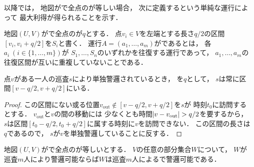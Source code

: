 以降では，
地図が{\graphLine}で全点の{\maxIdletime}が等しい場合，
次に定義するという単純な運行によって
最大利得が得られることを示す．

\begin{defi}
  \label{defi:independentSectionOperation}
  地図$(U, V)$が{\graphLine}で全点の{\maxIdletime}が$q$とする．
  点$v_i \in V$を左端とする長さ$q/2$の区間$[v_i, v_i + q/2]$を$S_i$と書く．
  運行$A = (a_1, \ldots, a_m)$がであるとは，
  各$a_i\ (i \in \{ 1, \ldots, m \})$が
  $S_1, \ldots, S_n$のいずれかを往復する運行であって，
  $a_1, \ldots, a_m$の往復区間が互いに重複していないことである．
\end{defi}


\begin{lemm}
  \label{lemm:RangeOfPatrollerOnLine}
  点$v$がある一人の巡査$s$により単独警邏されているとき，
  {\maxIdletime}を$q$として，
  $s$は常に区間$[v - q/2, v + q/2]$にいる．
\end{lemm}
\begin{proof}
  \newcommand{\vout}{v_{\mathrm{out}}}
  この区間にない或る位置$\vout \notin [v - q/2, v + q/2]$を$s$が
  時刻$t_0$に訪問するとする．
  $\vout$と$v$の間の移動には
  少なくとも時間$\abs{v - \vout} > q / 2$を要するから，
  $s$は区間$[t_0 - q / 2, t_0 + q / 2]$に属する時刻に$v$を訪問できない．
  この区間の長さは$q$であるので，
  $s$が$v$を単独警邏していることに反する．
\end{proof}


\begin{lemm}
  \label{lemm:LineUnaryIdletimeIndependentInterval}
  地図$(U, V)$が{\graphLine}で全点の{\maxIdletime}が等しいとする．
  $V$の任意の部分集合$W$について，
  $W$が巡査$m$人により警邏可能ならば$W$は巡査$m$人による{\indSectOperation}で警邏可能である．
\end{lemm}

